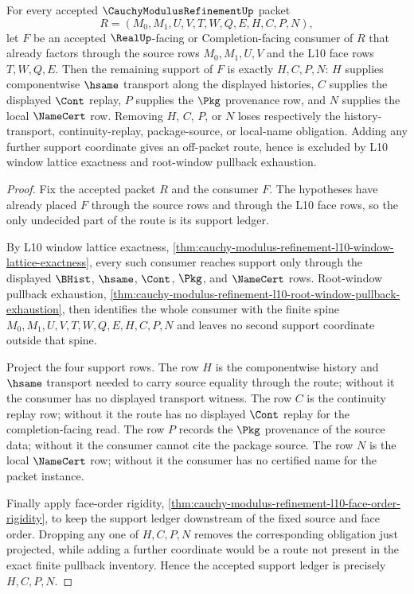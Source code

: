 \begin{theorem}
\label{thm:cauchy-modulus-refinement-l10-support-row-minimality}
For every accepted $\CauchyModulusRefinementUp$ packet
$$
R=(M_0,M_1,U,V,T,W,Q,E,H,C,P,N),
$$
let $F$ be an accepted $\RealUp$-facing or Completion-facing consumer of $R$ that already factors through the source rows $M_0,M_1,U,V$ and the L10 face rows $T,W,Q,E$. Then the remaining support of $F$ is exactly $H,C,P,N$: $H$ supplies componentwise $\hsame$ transport along the displayed histories, $C$ supplies the displayed $\Cont$ replay, $P$ supplies the $\Pkg$ provenance row, and $N$ supplies the local $\NameCert$ row. Removing $H$, $C$, $P$, or $N$ loses respectively the history-transport, continuity-replay, package-source, or local-name obligation. Adding any further support coordinate gives an off-packet route, hence is excluded by L10 window lattice exactness and root-window pullback exhaustion.
\end{theorem}
\begin{proof}
Fix the accepted packet $R$ and the consumer $F$. The hypotheses have already placed $F$ through the source rows and through the L10 face rows, so the only undecided part of the route is its support ledger.

By L10 window lattice exactness, \autoref{thm:cauchy-modulus-refinement-l10-window-lattice-exactness}, every such consumer reaches support only through the displayed $\BHist$, $\hsame$, $\Cont$, $\Pkg$, and $\NameCert$ rows. Root-window pullback exhaustion, \autoref{thm:cauchy-modulus-refinement-l10-root-window-pullback-exhaustion}, then identifies the whole consumer with the finite spine $M_0,M_1,U,V,T,W,Q,E,H,C,P,N$ and leaves no second support coordinate outside that spine.

Project the four support rows. The row $H$ is the componentwise history and $\hsame$ transport needed to carry source equality through the route; without it the consumer has no displayed transport witness. The row $C$ is the continuity replay row; without it the route has no displayed $\Cont$ replay for the completion-facing read. The row $P$ records the $\Pkg$ provenance of the source data; without it the consumer cannot cite the package source. The row $N$ is the local $\NameCert$ row; without it the consumer has no certified name for the packet instance.

Finally apply face-order rigidity, \autoref{thm:cauchy-modulus-refinement-l10-face-order-rigidity}, to keep the support ledger downstream of the fixed source and face order. Dropping any one of $H,C,P,N$ removes the corresponding obligation just projected, while adding a further coordinate would be a route not present in the exact finite pullback inventory. Hence the accepted support ledger is precisely $H,C,P,N$.
\end{proof}

